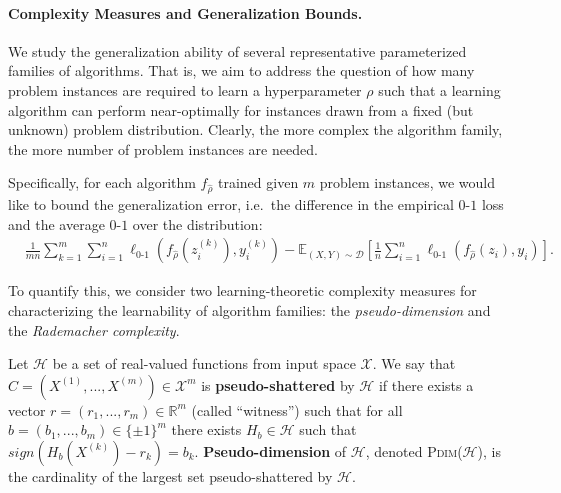 \paragraph{Complexity Measures and Generalization Bounds.}


We study the generalization ability of several representative parameterized families of algorithms. That is, we aim to address the question of how many problem instances are required to learn a hyperparameter $\rho$ such that a learning algorithm can perform near-optimally for instances drawn from a fixed (but unknown) problem distribution. Clearly, the more complex the algorithm family, the more number of problem instances are needed.

Specifically, for each algorithm $f_{\hat{\rho}}$ trained given $m$ problem instances, we would like to bound the generalization error, i.e.\ the difference in the empirical $0$-$1$ loss and the average $0$-$1$ over  the distribution:
\begin{align*}
&\frac{1}{mn}\sum_{k=1}^m \sum_{i=1}^n \ell_{\mathrm{0\text{-}1}}(f_{\hat{\rho}}(z_i^{(k)}), y_i^{(k)})
- \mathbb{E}_{\left(X,Y\right) \sim \mathcal{D}}\left[\frac{1}{n}\sum_{i=1}^n \ell_{0\text{-}1}\left(f_{\hat \rho}(z_i),y_i\right)\right].
\end{align*}
\label{eqn:algo sec gen}


\noindent To quantify this, we consider two learning-theoretic complexity measures for characterizing the learnability of algorithm families: the \textit{pseudo-dimension} and the \textit{Rademacher complexity}. 

\begin{definition}
    Let $\mathcal{H}$ be a set of real-valued functions from input space $\mathcal{X}$. We say that $C = (X^{(1)}, ..., X^{(m)}) \in \mathcal{X}^m$ is \textbf{pseudo-shattered} by $\mathcal{H}$ if there exists a vector $r = (r_1, ..., r_m) \in \mathbb{R}^m$ (called ``witness'') such that for all $b = (b_1, ..., b_m) \in \{\pm1\}^m$ there exists $H_b \in \mathcal{H}$ such that $sign(H_b(X^{(k)})-r_k) = b_k$. \textbf{Pseudo-dimension} of $\mathcal{H}$, denoted \textsc{Pdim}($\mathcal{H}$), is the cardinality of the largest set pseudo-shattered by $\mathcal{H}$.
\end{definition}

